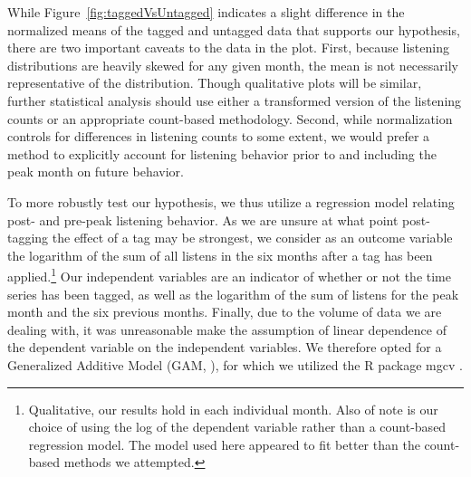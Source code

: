 While Figure~\ref{fig:taggedVsUntagged} indicates a slight difference in the normalized means of the tagged and untagged data that supports our hypothesis, there are two important caveats to the data in the plot. First, because listening distributions are heavily skewed for any given month, the mean is not necessarily representative of the distribution. Though qualitative plots will be similar, further statistical analysis should use either a transformed version of the listening counts or an appropriate count-based methodology. Second, while normalization controls for differences in listening counts to some extent, we would prefer a method to explicitly account for listening behavior prior to and including the peak month on future behavior.

To more robustly test our hypothesis, we thus utilize a regression model relating post- and pre-peak listening behavior. As we are unsure at what point post-tagging the effect of a tag may be strongest, we consider as an outcome variable the logarithm of the sum of all listens in the six months after a tag has been applied.\footnote{Qualitative, our results hold in each individual month. Also of note is our choice of using the log of the dependent variable rather than a count-based regression model. The model used here appeared to fit better than the count-based methods we attempted.} Our independent variables are an indicator of whether or not the time series has been tagged, as well as the logarithm of the sum of listens for the peak month and the six previous months.  Finally, due to the volume of data we are dealing with, it was unreasonable make the assumption of linear dependence of the dependent variable on the independent variables. We therefore opted for a Generalized Additive Model (GAM, \cite{hastie1990generalized}), for which we utilized the R package mgcv \cite{wood2001mgcv}.

